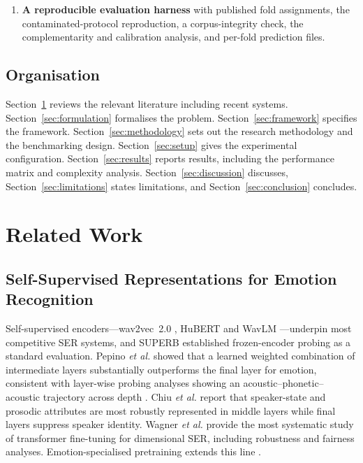 \documentclass[journal,onecolumn,11pt,draftclsnofoot]{IEEEtran}   %
\begin{document}
\begin{enumerate}
    the contaminated protocol the female--male accuracy disparity is 2.5 points;
    under speaker-disjoint evaluation of the same system it is 21.6 points, and
    the dominant per-class failure (\emph{happy}, $F_1$ 0.511) is invisible
    ($F_1$ 0.915). Protocol choice therefore distorts not only reported accuracy
    but the fairness and error audits built on it (Section~\ref{sec:speaker}).
  \item \textbf{A reproducible evaluation harness} with published fold
    assignments, the contaminated-protocol reproduction, a corpus-integrity
    check, the complementarity and calibration analysis, and per-fold prediction
    files.
\end{enumerate}

\subsection{Organisation}
Section~\ref{sec:related} reviews the relevant literature including recent
systems. Section~\ref{sec:formulation} formalises the problem.
Section~\ref{sec:framework} specifies the framework.
Section~\ref{sec:methodology} sets out the research methodology and the
benchmarking design. Section~\ref{sec:setup} gives the experimental
configuration. Section~\ref{sec:results} reports results, including the
performance matrix and complexity analysis. Section~\ref{sec:discussion}
discusses, Section~\ref{sec:limitations} states limitations, and
Section~\ref{sec:conclusion} concludes.

\section{Related Work}
\label{sec:related}

\subsection{Self-Supervised Representations for Emotion Recognition}
Self-supervised encoders---wav2vec~2.0 \cite{baevski2020wav2vec2}, HuBERT
\cite{hsu2021hubert} and WavLM \cite{chen2022wavlm}---underpin most competitive
SER systems, and SUPERB \cite{yang2021superb} established frozen-encoder probing
as a standard evaluation. Pepino \emph{et al.} \cite{pepino2021wav2vec} showed
that a learned weighted combination of intermediate layers substantially
outperforms the final layer for emotion, consistent with layer-wise probing
analyses showing an acoustic--phonetic--acoustic trajectory across depth
\cite{pasad2021layerwise,pasad2023comparative}. Chiu \emph{et al.}
\cite{chiu2025probing} report that speaker-state and prosodic attributes are
most robustly represented in middle layers while final layers suppress speaker
identity. Wagner \emph{et al.} \cite{wagner2023dawn} provide the most systematic
study of transformer fine-tuning for dimensional SER, including robustness and
fairness analyses. Emotion-specialised pretraining extends this line
\cite{chen2024vesper,ma2024emotion2vec}.
\end{document}
